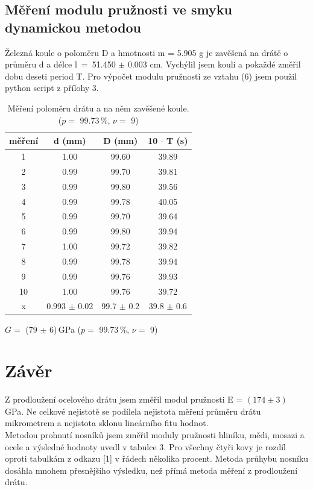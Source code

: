 \documentclass[a4paper,11pt]{article}
\newcommand{\vrn}[6]{\ensuremath{#1 =} (#2 $\pm$ #3)\,#4 ($p=$ #5\,\%, $\nu=$ #6)}
\begin{document}
\subsection{Měření modulu pružnosti ve smyku dynamickou metodou}

Železná koule o poloměru D a hmotnosti m = 5.905 g je zavěšená na drátě o průměru d a délce  l~=~51.450 $\pm$ 0.003 cm. Vychýlil jsem kouli a pokaždé změřil dobu deseti period T. Pro výpočet modulu pružnosti ze vztahu (6) jsem použil python script z přílohy 3.

\begin{table}[h]
 \centering
 \begin{tabular}{| c | c | c | c |}
    \hline
    měření & d (mm) & D (mm) & 10 $\cdot$ T (s) \\ 
    \hline
    1 & 1.00 & 99.60 & 39.89 \\
    2 & 0.99 & 99.70 & 39.81 \\
    3 & 0.99 & 99.80 & 39.56 \\
    4 & 0.99 & 99.78 & 40.05 \\
    5 & 0.99 & 99.70 & 39.64 \\
    6 & 0.99 & 99.80 & 39.94 \\
    7 & 1.00 & 99.72 & 39.82 \\
    8 & 0.99 & 99.78 & 39.94 \\
    9 & 0.99 & 99.76 & 39.93 \\
    10 & 1.00 & 99.76 & 39.72 \\
    \hline
    x & 0.993 $\pm$ 0.02 & 99.7 $\pm$ 0.2 & 39.8 $\pm$ 0.6 \\
    \hline
 \end{tabular}
 \caption{ Měření poloměru drátu a na něm zavěšené koule. ($p=$ 99.73\,\%, $\nu=$ 9)}
\end{table}

\begin{center}
  \vrn{G}{79}{6}{GPa}{99.73}{9}
\end{center}

\section{Závěr}

Z prodloužení ocelového drátu jsem změřil modul pružnosti E = $(174 \pm 3)$ GPa. Ne celkové nejistotě se podílela nejistota měření průměru drátu mikrometrem a nejistota sklonu lineárního fitu hodnot.  \\

Metodou prohnutí nosníků jsem změřil moduly pružnosti hliníku, mědi, mosazi a ocele a výsledné hodnoty uvedl v tabulce 3. Pro všechny čtyři kovy je rozdíl oproti tabulkám z odkazu [1] v řádech několika procent. Metoda průhybu nosníku dosáhla mnohem přesnějšího výsledku, než přímá metoda měření z prodloužení drátu. \\
\end{document}
